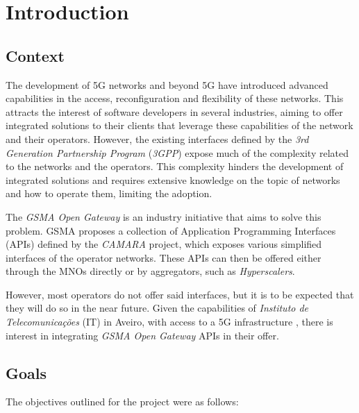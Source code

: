 \chapter{Introduction}

\section{Context}

The development of 5G networks and beyond 5G have introduced advanced
capabilities in the access, reconfiguration and flexibility of these networks.
This attracts the interest of software developers in several industries, aiming
to offer integrated solutions to their clients that leverage these capabilities
of the network and their operators. However, the existing interfaces defined by
the \emph{3rd Generation Partnership Program} (\emph{3GPP}) expose much of the
complexity related to the networks and the operators. This complexity hinders
the development of integrated solutions and requires extensive knowledge on the
topic of networks and how to operate them, limiting the adoption.

The \emph{GSMA Open Gateway} is an industry initiative that aims to solve this
problem. GSMA proposes a collection of Application Programming Interfaces
(APIs) defined by the \emph{CAMARA} project, which exposes various simplified
interfaces of the operator networks. These APIs can then be offered either
through the MNOs directly or by aggregators, such as \emph{Hyperscalers}.

However, most operators do not offer said interfaces, but it is to be expected
that they will do so in the near future. Given the capabilities of
\emph{Instituto de Telecomunicações} (IT) in Aveiro, with access to a 5G
infrastructure \cite{5GAIner}, there is interest in integrating \emph{GSMA Open
	Gateway} APIs in their offer.

\section{Goals}

The objectives outlined for the project were as follows:

